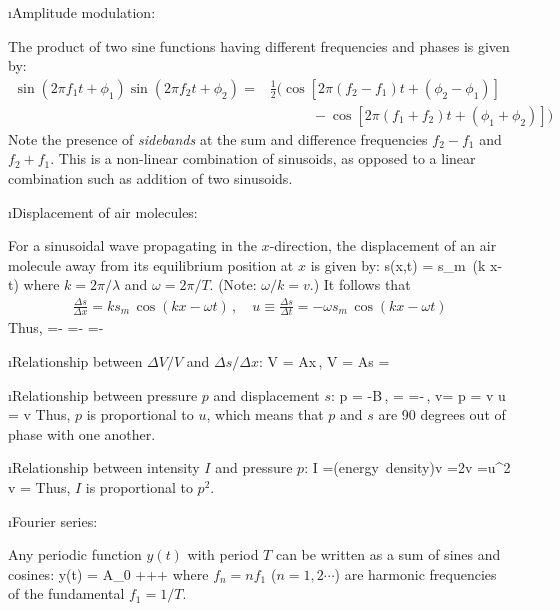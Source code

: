 \i Amplitude modulation:

The product of two sine functions having different 
frequencies and phases is given by:
%
\begin{align}
\sin(2\pi f_1 t + \phi_1)\sin(2\pi f_2 t + \phi_2)
=
&\frac{1}{2}\big(
\cos\left[2\pi(f_2-f_1)t+(\phi_2-\phi_1)\right]
\nonumber\\
&\quad\quad\quad 
-\cos\left[2\pi(f_1+f_2)t+(\phi_1+\phi_2)\right]
\big)
\end{align}
%
Note the presence of {\em sidebands} at the sum and
difference frequencies $f_2-f_1$ and $f_2+f_1$.
This is a non-linear combination of sinusoids, as opposed
to a linear combination such as addition of two sinusoids.

\i Displacement of air molecules:

For a sinusoidal wave propagating in the $x$-direction, 
the displacement of an air molecule away from its equilibrium 
position at $x$ is given by:
%
\be
s(x,t) = s_m \,\sin \left(k x-\omega t\right)
\ee
%
where $k=2\pi/\lambda$ and $\omega=2\pi/T$.
(Note: $\omega/k=v$.)
It follows that
%
\begin{align}
\frac{\Delta s}{\Delta x} 
= k s_m\,\cos \left(k x-\omega t\right)\,,
\quad
u\equiv
\frac{\Delta s}{\Delta t} 
= -\omega s_m\,\cos \left(k x-\omega t\right)
\end{align}
%
Thus,
%
\be
{}
=-
=-
=-
\ee
%

\i Relationship between $\Delta V/V$ and $\Delta s/\Delta x$:
%
\be
V = A\Delta x\,,
\quad
\Delta V = A\Delta s
\quad\Rightarrow\quad
{} = 
\ee

\i Relationship between pressure $p$ and displacement $s$:
%
\be
p = -B\,,
\quad
{} = =-\,,
\quad
v=
\quad\Rightarrow\quad
p = \rho v u = \rho v
\ee
%
Thus, $p$ is proportional to $u$, 
which means that $p$ and 
$s$ are 90 degrees out of phase with one another.

\i Relationship between intensity $I$ and pressure $p$:
%
\be
I =({\rm energy\ density})\cdot v
=2\cdot {}\cdot v
=\rho u^2 v 
= 
\ee
%
Thus, $I$ is proportional to $p^2$.

\i Fourier series:

Any periodic function $y(t)$ with period $T$ can be
written as a sum of sines and cosines:
%
\be
y(t) = A_0 
+
+
+ \cdots
\ee
%
where $f_n=n f_1$ ($n=1,2\cdots$) 
are harmonic frequencies of the fundamental $f_1=1/T$.

